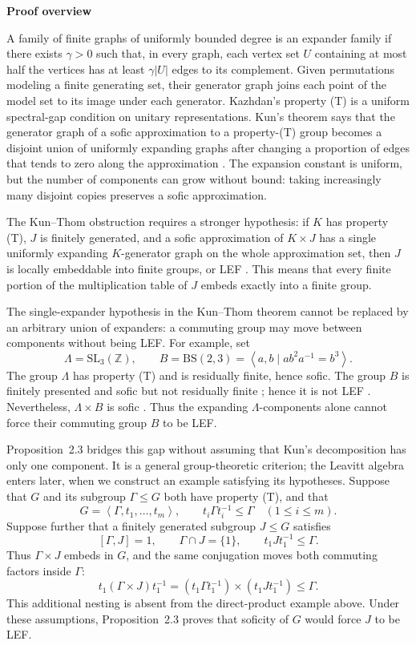 \documentclass[10pt]{article}
\newcommand{\Z}{\mathbb{Z}}
\newcommand{\subhead}[1]{\par\medskip\noindent\textbf{#1}\par\smallskip}
\newcommand{\abs}[1]{\left|#1\right|}
\newcommand{\angles}[1]{\left\langle #1\right\rangle}
\begin{document}
\subhead{Proof overview}
A family of finite graphs of uniformly bounded degree is an expander family if there exists $\gamma>0$ such that, in every graph, each vertex set $U$ containing at most half the vertices has at least $\gamma\abs{U}$ edges to its complement. Given permutations modeling a finite generating set, their generator graph joins each point of the model set to its image under each generator. Kazhdan's property (T) is a uniform spectral-gap condition on unitary representations. Kun's theorem says that the generator graph of a sofic approximation to a property-(T) group becomes a disjoint union of uniformly expanding graphs after changing a proportion of edges that tends to zero along the approximation \cite[Theorem~1]{Kun19}. The expansion constant is uniform, but the number of components can grow without bound: taking increasingly many disjoint copies preserves a sofic approximation.

The Kun--Thom obstruction requires a stronger hypothesis: if $K$ has property (T), $J$ is finitely generated, and a sofic approximation of $K\times J$ has a single uniformly expanding $K$-generator graph on the whole approximation set, then $J$ is locally embeddable into finite groups, or LEF \cite[Theorem~1.1]{KT19}. This means that every finite portion of the multiplication table of $J$ embeds exactly into a finite group.

The single-expander hypothesis in the Kun--Thom theorem cannot be replaced by an arbitrary union of expanders: a commuting group may move between components without being LEF\@. For example, set
\[
\Lambda=\mathrm{SL}_3(\Z),\qquad B=\mathrm{BS}(2,3)=\angles{a,b\mid ab^2a^{-1}=b^3}.
\]
The group $\Lambda$ has property (T) and is residually finite, hence sofic. The group $B$ is finitely presented and sofic but not residually finite \cite[Example~4.6]{Pes08}; hence it is not LEF \cite[Theorem~2.2]{VG97}. Nevertheless, $\Lambda\times B$ is sofic \cite[Theorem~1(1)]{ES06}. Thus the expanding $\Lambda$-components alone cannot force their commuting group $B$ to be LEF.

Proposition~2.3 bridges this gap without assuming that Kun's decomposition has only one component. It is a general group-theoretic criterion; the Leavitt algebra enters later, when we construct an example satisfying its hypotheses. Suppose that $G$ and its subgroup $\Gamma\leq G$ both have property (T), and that
\[
G=\angles{\Gamma,t_1,\ldots,t_m},\qquad t_i\Gamma t_i^{-1}\leq\Gamma\quad(1\leq i\leq m).
\]
Suppose further that a finitely generated subgroup $J\leq G$ satisfies
\[
[\Gamma,J]=1,\qquad \Gamma\cap J=\{1\},\qquad t_1Jt_1^{-1}\leq\Gamma.
\]
Thus $\Gamma\times J$ embeds in $G$, and the same conjugation moves both commuting factors inside $\Gamma$:
\[
t_1(\Gamma\times J)t_1^{-1}=(t_1\Gamma t_1^{-1})\times(t_1Jt_1^{-1})\leq\Gamma.
\]
This additional nesting is absent from the direct-product example above. Under these assumptions, Proposition~2.3 proves that soficity of $G$ would force $J$ to be LEF.
\end{document}
